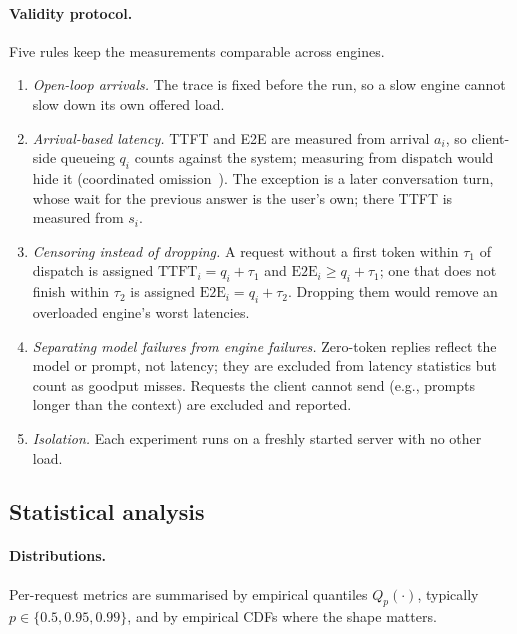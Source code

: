 \paragraph{Validity protocol.}
Five rules keep the measurements comparable across engines.
\begin{enumerate}
  \item \emph{Open-loop arrivals.} The trace is fixed before the run, so a slow engine cannot
  slow down its own offered load.
  \item \emph{Arrival-based latency.} TTFT and E2E are measured from arrival $a_i$, so client-side
  queueing $q_i$ counts against the system; measuring from dispatch would hide it (coordinated
  omission~\cite{tene2015latency}). The exception is a later conversation turn, whose wait for the
  previous answer is the user's own; there TTFT is measured from $s_i$.
  \item \emph{Censoring instead of dropping.} A request without a first token within $\tau_1$ of
  dispatch is assigned $\mathrm{TTFT}_i = q_i + \tau_1$ and $\mathrm{E2E}_i \ge q_i + \tau_1$; one that
  does not finish within $\tau_2$ is assigned $\mathrm{E2E}_i = q_i + \tau_2$. Dropping them would
  remove an overloaded engine's worst latencies.
  \item \emph{Separating model failures from engine failures.} Zero-token replies reflect the model
  or prompt, not latency; they are excluded from latency statistics but count as goodput misses.
  Requests the client cannot send (e.g., prompts longer than the context) are excluded and reported.
  \item \emph{Isolation.} Each experiment runs on a freshly started server with no other load.
\end{enumerate}

\subsection{Statistical analysis}
\label{sec:analysis}

\paragraph{Distributions.}
Per-request metrics are summarised by empirical quantiles $Q_p(\cdot)$, typically
$p \in \{0.5, 0.95, 0.99\}$, and by empirical CDFs where the shape matters. 

